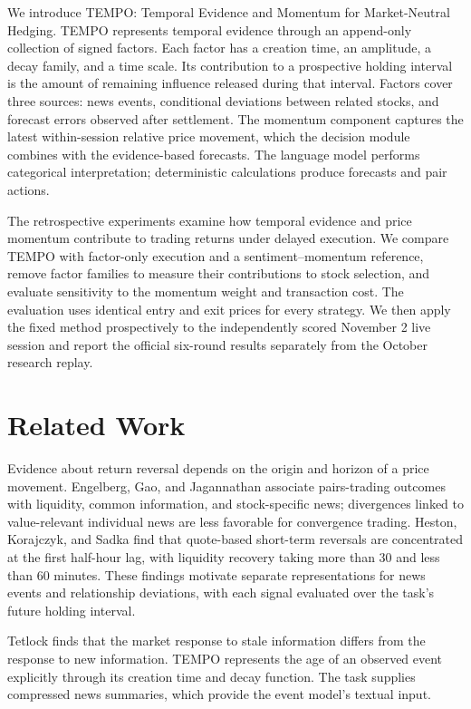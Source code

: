 \documentclass[conference]{IEEEtran}
\begin{document}
We introduce TEMPO: Temporal Evidence and Momentum for Market-Neutral Hedging. TEMPO represents temporal evidence through an append-only collection of signed factors. Each factor has a creation time, an amplitude, a decay family, and a time scale. Its contribution to a prospective holding interval is the amount of remaining influence released during that interval. Factors cover three sources: news events, conditional deviations between related stocks, and forecast errors observed after settlement. The momentum component captures the latest within-session relative price movement, which the decision module combines with the evidence-based forecasts. The language model performs categorical interpretation; deterministic calculations produce forecasts and pair actions.

The retrospective experiments examine how temporal evidence and price momentum contribute to trading returns under delayed execution. We compare TEMPO with factor-only execution and a sentiment--momentum reference, remove factor families to measure their contributions to stock selection, and evaluate sensitivity to the momentum weight and transaction cost. The evaluation uses identical entry and exit prices for every strategy. We then apply the fixed method prospectively to the independently scored November 2 live session and report the official six-round results separately from the October research replay.

\section{Related Work}
Evidence about return reversal depends on the origin and horizon of a price movement. Engelberg, Gao, and Jagannathan associate pairs-trading outcomes with liquidity, common information, and stock-specific news; divergences linked to value-relevant individual news are less favorable for convergence trading\cite{engelberg2008}. Heston, Korajczyk, and Sadka find that quote-based short-term reversals are concentrated at the first half-hour lag, with liquidity recovery taking more than 30 and less than 60 minutes\cite{heston2010}. These findings motivate separate representations for news events and relationship deviations, with each signal evaluated over the task's future holding interval.

Tetlock finds that the market response to stale information differs from the response to new information\cite{tetlock2011}. TEMPO represents the age of an observed event explicitly through its creation time and decay function. The task supplies compressed news summaries, which provide the event model's textual input.
\end{document}
